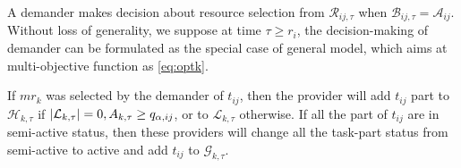 A demander makes decision about resource selection from $\mathcal{R}_{ij,\tau}$ when $\mathcal{B}_{ij,\tau} = \mathcal{A}_{ij}$. Without loss of generality, we suppose at time $\tau \ge r_i$,
the decision-making of demander can be formulated as the special case of general model, which aims at multi-objective function as \autoref{eq:optk}.


If $mr_k$ was selected by the demander of $t_{ij}$, then the provider will add $t_{ij}$ part to $\mathcal{H}_{k,\tau}$ if $\left|\mathcal{L}_{k,\tau}\right|=0,A_{k,\tau}\ge q_{\alpha,ij}$, or to  $\mathcal{L}_{k,\tau}$ otherwise.
If all the part of $t_{ij}$ are in semi-active status, then these providers will change all the task-part status from semi-active to active and add $t_{ij}$ to $\mathcal{G}_{k,\tau}$.

